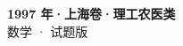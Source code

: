 \documentclass[zihao=-4, a4paper]{ctexart}
\begin{document}
\begin{center}
  {\Large\bfseries 1997 年·上海卷·理工农医类}\\[4pt]
  {\large 数学 · 试题版}
\end{center}
\medskip
{}

\end{document}
